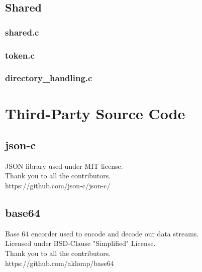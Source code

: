 \documentclass{article}
\begin{document}
\subsection{Shared}
    \subsubsection{shared.c}
	
	\subsubsection{token.c}
	
	\subsubsection{directory\_handling.c}
	

\section{Third-Party Source Code}
\subsection{json-c}
JSON library used under MIT license.\\
Thank you to all the contributors.\\
https://github.com/json-c/json-c/\\
\subsection{base64}
Base 64 encorder used to encode and decode our data streams.\\
Licensed under BSD-Clause "Simplified" License.\\
Thank you to all the contributors.\\
https://github.com/aklomp/base64\\
\end{document}
